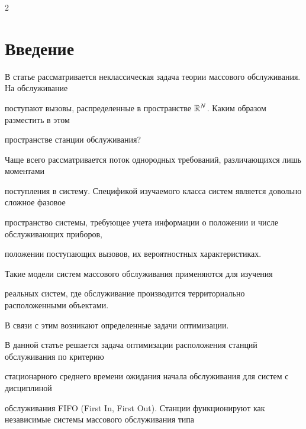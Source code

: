       \begin{multicols}{2}





      \label{st\stat}





\section{Введение}











В статье рассматривается неклассическая задача теории массового обслуживания. На обслуживание


поступают вызовы, распределенные в пространстве ${\mathbb{R}}^N$. Каким образом разместить в этом


пространстве станции обслуживания?





Чаще всего рассматривается поток однородных требований, различающихся лишь моментами


поступления в систему. Спецификой изучаемого класса систем является довольно сложное фазовое


пространство системы, требующее учета информации о положении и числе обслуживающих приборов,


положении поступающих вызовов, их вероятностных характеристиках.





Такие модели систем массового обслуживания применяются для изучения


реальных систем, где обслуживание производится территориально расположенными объектами.


В связи с этим возникают определенные задачи оптимизации.





В данной статье решается задача оптимизации расположения станций обслуживания по критерию


стационарного среднего времени ожидания начала обслуживания для систем с дисциплиной


обслуживания FIFO (First In, First Out). Станции функционируют как независимые системы массового обслуживания типа



\end{multicols}
